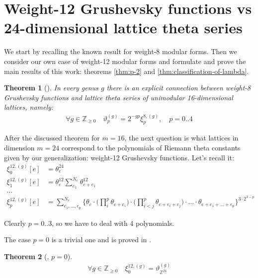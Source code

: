 \documentclass{article}
\newcommand{\ZZ}{\mathbb{Z}}
\theoremstyle{plain}
\newtheorem{theorem}{Theorem}[section]
\theoremstyle{definition}
\begin{document}
\section{Weight-12 Grushevsky functions vs 24-dimensional lattice theta series}\label{sec:main}
We start by recalling the known result for weight-8 modular forms. Then we consider
our own case of weight-12 modular forms and 
formulate and prove the main results of this work: theorems \ref{thm:p-2} and \ref{thm:classification-of-lambda}.
\begin{theorem}[\cite*{dunin-barkowski}]
    In every genus $g$ there is an explicit connection between 
    weight-8 Grushevsky functions and lattice theta series  of unimodular 16-dimensional lattices, namely:
    \begin{align}
        \forall g \in\mathbb{Z}_{\geq 0} \quad \vartheta^{(g)}_p = 2^{-gp}\xi_p^{8, (g)}, \quad p=0..4
    \end{align}
\end{theorem}
    
    After the discussed theorem for $m=16$, the next question is
    what lattices in dimension $m=24$ correspond to the polynomials of
    Riemann theta constants given by our generalization: weight-12 Grushevsky functions. 
    Let's recall it:
    \begin{align}
        \xi_0^{12, (g)}[e] &= \theta^{24}_e \nonumber \\
        \xi_1^{12, (g)}[e] &= \theta^{12}_e \sum_{e_1}^{N_e} \theta^{12}_{e+e_1} \nonumber \\
        ... \nonumber \\
        \xi_p^{12, (g)}[e] &= \sum_{e_1, ..., e_p}^{N_e} \Bigg \{
            \theta_e 
            \cdot \Big( \prod_i^p \theta_{e + e_i} \Big)
            \cdot \Big( \prod_{i < j}^p \theta_{e + e_i + e_j} \Big) \cdot ...
            \cdot \theta_{e + e_1 + ... + e_p}
        \Bigg \} ^ {3 \cdot 2^{3 - p}} \nonumber
    \end{align}

    Clearly $p=0..3$, so we have to deal with 4 polynomials.

    The case $p=0$ is a trivial one and is proved in \cite{conway}.
    \begin{theorem}[\cite{conway}, $p=0$]
        \begin{align}
            \forall g \in\mathbb{Z}_{\geq 0} \quad \xi^{12, (g)}_0=\vartheta^{(g)}_{\ZZ^{24}}
        \end{align}
    \end{theorem}
\end{document}
